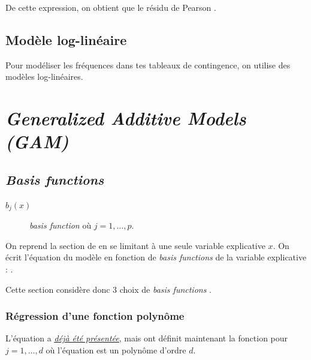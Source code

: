 \documentclass[french]{article}
\begin{document}
\begin{multicols*}{2}
\bigskip

De cette expression, on obtient que le résidu de Pearson .


\columnbreak
\subsection{Modèle log-linéaire}
Pour modéliser les fréquences dans tes tableaux de contingence, on utilise des modèles log-linéaires.



\newpage
\section{\og \textit{Generalized Additive Models (GAM)} \fg{}}
\subsection{\og \textit{Basis functions} \fg{}}\label{subsec:BasisFunctions}
\begin{distributions}[Notation]
\begin{description}
	\item[$b_{j}(x)$]	\og \textit{basis function} \fg{} où $j = 1, \dots, p$.
\end{description}
\end{distributions}

\begin{rappel_enhanced}[Contexte]
On reprend la section de \textit{\underline{}} en se limitant à une seule variable explicative $x$. On écrit l'équation du modèle en fonction de \og \textit{basis functions} \fg{} de la variable explicative : . 

\bigskip

Cette section considère donc 3 choix de \og \textit{basis functions} \fg{}.
\end{rappel_enhanced}


\subsubsection{Régression d'une fonction polynôme}
L'équation a \textit{\color{bleudefrance}\underline{\hyperlink{polyReg}{\color{bleudefrance} déjà été présentée}}}, mais ont définit maintenant la fonction  pour $j = 1, \dots, d$ où l'équation est un polynôme d'ordre $d$.




\end{multicols*}
\end{document}
